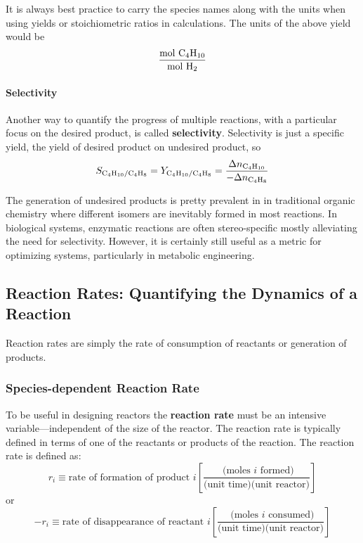 \documentclass[
]{article}
\begin{document}
It is always best practice to carry the species names along with the units when using yields or stoichiometric ratios in calculations. The units of the above yield would be
\[\frac{\text{mol } \ce{C4H10}}{\text{mol } \ce{H2}}\]

\hypertarget{selectivity}{%
\paragraph{Selectivity}\label{selectivity}}

Another way to quantify the progress of multiple reactions, with a particular focus on the desired product, is called \textbf{selectivity}. Selectivity is just a specific yield, the yield of desired product on undesired product, so
\[S_{\ce{C4H10}/\ce{C4H8}} = Y_{\ce{C4H10}/\ce{C4H8}} = \frac{\Delta n_{\ce{C4H10}}}{-\Delta n_{\ce{C4H8}}}\]

The generation of undesired products is pretty prevalent in in traditional organic chemistry where different isomers are inevitably formed in most reactions. In biological systems, enzymatic reactions are often stereo-specific mostly alleviating the need for selectivity. However, it is certainly still useful as a metric for optimizing systems, particularly in metabolic engineering.

\hypertarget{reaction-rates-quantifying-the-dynamics-of-a-reaction}{%
\subsection{Reaction Rates: Quantifying the Dynamics of a Reaction}\label{reaction-rates-quantifying-the-dynamics-of-a-reaction}}

Reaction rates are simply the rate of consumption of reactants or generation of products.

\hypertarget{species-dependent-reaction-rate}{%
\subsubsection{Species-dependent Reaction Rate}\label{species-dependent-reaction-rate}}

To be useful in designing reactors the \textbf{reaction rate} must be an intensive variable---independent of the size of the reactor. The reaction rate is typically defined in terms of one of the reactants or products of the reaction. The reaction rate is defined as:
\[r_i \equiv \text{rate of formation of product }i \left[\frac{\text{ (moles }i \text{ formed)}}{\text{(unit time)(unit reactor)}}\right]\]
or
\[-r_i \equiv \text{rate of disappearance of reactant }i \left[\frac{\text{ (moles }i \text{ consumed)}}{\text{(unit time)(unit reactor)}}\right]\]
\end{document}
